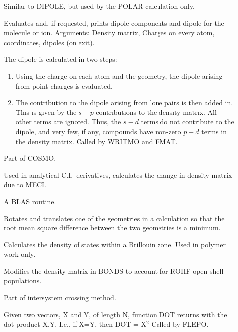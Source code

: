 \begin{description}
\item[] Similar to DIPOLE, but used by the POLAR calculation 
only.

\item[] Evaluates and, if requested, prints  dipole
components and dipole for the molecule or ion. Arguments: Density matrix, 
Charges on every atom, coordinates, dipoles (on exit). 

The dipole is calculated in two steps:
\begin{enumerate}
\item Using the charge on each atom and the geometry, the dipole arising from
point  charges is evaluated.

\item The contribution to the dipole arising from lone pairs is then added in. 
This is  given by the $s-p$ contributions to the density matrix.  All other
terms are ignored. Thus, the $s-d$ terms do not contribute to the dipole, and
very few, if any,  compounds have non-zero $p-d$ terms in the density matrix.
Called by WRITMO and FMAT.
\end{enumerate}

\item[] Part of COSMO.

\item[] Used in analytical C.I.\ derivatives, 
calculates the change in density matrix due to MECI.

\item[] A BLAS routine.

\item[] Rotates and translates one of the geometries in a 
 calculation so that the root mean square difference between  the
two geometries is a minimum.

\item[] Calculates the density of states within a  Brillouin zone. 
Used in polymer work only.

\item[] Modifies the density matrix in BONDS to account for ROHF
open shell populations.

\item[] Part of intersystem crossing method.

\item[] Given two vectors, X and Y, of length N, function DOT returns
with the dot product X.Y. I.e., if X=Y, then DOT = X$^2$ Called by FLEPO.


\end{description}
